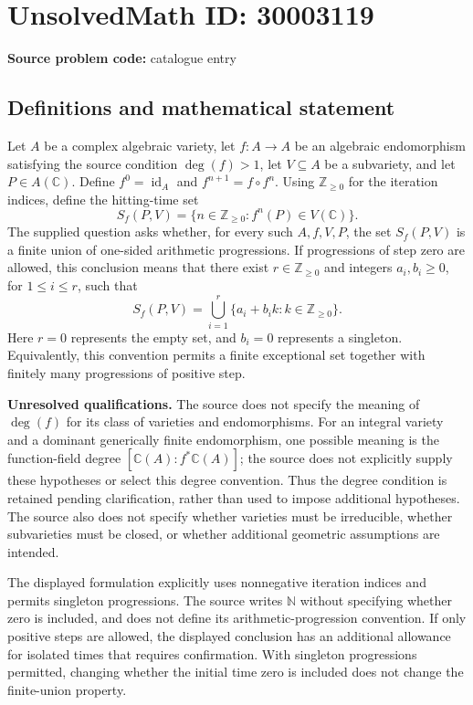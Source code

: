 \documentclass[11pt]{article}
\newcommand{\N}{\mathbb{N}}
\newcommand{\Z}{\mathbb{Z}}
\newcommand{\C}{\mathbb{C}}
\begin{document}
\section*{UnsolvedMath ID: 30003119}
\textbf{Source problem code:} catalogue entry
\subsection{Definitions and mathematical statement}
Let \(A\) be a complex algebraic variety, let \(f:A\to A\) be an algebraic endomorphism satisfying the source condition \(\deg(f)>1\), let \(V\subseteq A\) be a subvariety, and let \(P\in A(\C)\). Define \(f^0=\operatorname{id}_A\) and \(f^{n+1}=f\circ f^n\). Using \(\Z_{\geq 0}\) for the iteration indices, define the hitting-time set
\[
S_f(P,V)=\{n\in\Z_{\geq 0}:f^n(P)\in V(\C)\}.
\]
The supplied question asks whether, for every such \(A,f,V,P\), the set \(S_f(P,V)\) is a finite union of one-sided arithmetic progressions. If progressions of step zero are allowed, this conclusion means that there exist \(r\in\Z_{\geq 0}\) and integers \(a_i,b_i\geq 0\), for \(1\leq i\leq r\), such that
\[
S_f(P,V)=\bigcup_{i=1}^{r}\{a_i+b_i k:k\in\Z_{\geq 0}\}.
\]
Here \(r=0\) represents the empty set, and \(b_i=0\) represents a singleton. Equivalently, this convention permits a finite exceptional set together with finitely many progressions of positive step.

\textbf{Unresolved qualifications.} The source does not specify the meaning of \(\deg(f)\) for its class of varieties and endomorphisms. For an integral variety and a dominant generically finite endomorphism, one possible meaning is the function-field degree \([\C(A):f^*\C(A)]\); the source does not explicitly supply these hypotheses or select this degree convention. Thus the degree condition is retained pending clarification, rather than used to impose additional hypotheses. The source also does not specify whether varieties must be irreducible, whether subvarieties must be closed, or whether additional geometric assumptions are intended.

The displayed formulation explicitly uses nonnegative iteration indices and permits singleton progressions. The source writes \(\N\) without specifying whether zero is included, and does not define its arithmetic-progression convention. If only positive steps are allowed, the displayed conclusion has an additional allowance for isolated times that requires confirmation. With singleton progressions permitted, changing whether the initial time zero is included does not change the finite-union property.
\end{document}
